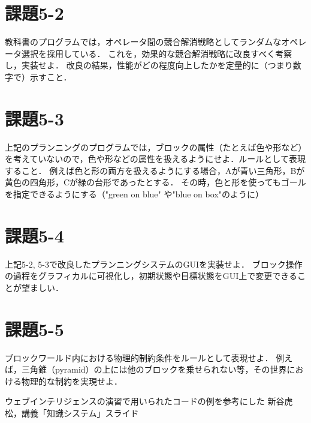 \documentclass{jarticle}
\begin{document}
\section{課題5-2}
\begin{screen}
    教科書のプログラムでは，オペレータ間の競合解消戦略としてランダムなオペレータ選択を採用している．
    これを，効果的な競合解消戦略に改良すべく考察し，実装せよ．
    改良の結果，性能がどの程度向上したかを定量的に（つまり数字で）示すこと．
\end{screen}

\section{課題5-3}
\begin{screen}
    上記のプランニングのプログラムでは，ブロックの属性（たとえば色や形など）を考えていないので，色や形などの属性を扱えるようにせよ．ルールとして表現すること．
    例えば色と形の両方を扱えるようにする場合，Aが青い三角形，Bが黄色の四角形，Cが緑の台形であったとする．
    その時，色と形を使ってもゴールを指定できるようにする（"green on blue" や"blue on box"のように）
\end{screen}

\section{課題5-4}
\begin{screen}
    上記5-2, 5-3で改良したプランニングシステムのGUIを実装せよ．
    ブロック操作の過程をグラフィカルに可視化し，初期状態や目標状態をGUI上で変更できることが望ましい．
\end{screen}

\section{課題5-5}
\begin{screen}
    ブロックワールド内における物理的制約条件をルールとして表現せよ．
    例えば，三角錐（pyramid）の上には他のブロックを乗せられない等，その世界における物理的な制約を実現せよ．
\end{screen}

\begin{thebibliography}{99}
     ウェブインテリジェンスの演習で用いられたコードの例を参考にした
     新谷虎松，講義「知識システム」スライド
\end{thebibliography}
\end{document}
